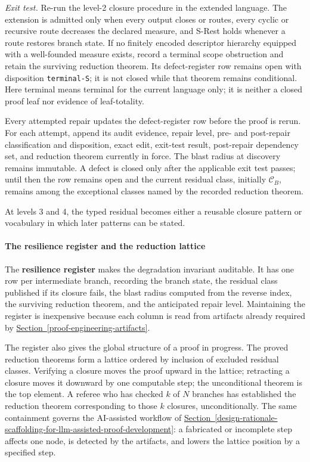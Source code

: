 \documentclass[
  11pt,
]{article}
\theoremstyle{definition}
\newcommand{\secref}[1]{\hyperref[#1]{Section~\ref*{#1}}}
\begin{document}
\begin{enumerate}
  \emph{Exit test.} Re-run the level-2 closure procedure in the extended
  language. The extension is admitted only when every output closes or
  routes, every cyclic or recursive route decreases the declared measure,
  and S-Rest holds whenever a route restores branch state. If no
  finitely encoded descriptor hierarchy equipped with a well-founded
  measure exists, record a terminal scope obstruction and retain the
  surviving reduction theorem. Its defect-register row remains open with disposition
  \texttt{terminal-S}; it is not closed while that theorem remains
  conditional. Here terminal means terminal for the current language
  only; it is neither a closed proof leaf nor evidence of leaf-totality.
\end{enumerate}

Every attempted repair updates the defect-register row before the proof
is rerun. For each attempt, append its audit evidence, repair level,
pre- and post-repair classification and disposition, exact edit,
exit-test result, post-repair dependency set, and reduction theorem
currently in force. The blast radius at discovery remains
immutable. A defect is closed only after the applicable exit test
passes; until then the row remains open and the current residual class,
initially \(\mathcal C_B\), remains among the exceptional classes named
by the recorded reduction theorem.

At levels 3 and 4, the typed residual becomes either a reusable closure
pattern or vocabulary in which later patterns can be stated.

\paragraph{The resilience register and the reduction
lattice}\label{the-resilience-register-and-the-reduction-lattice}

The \textbf{resilience register} makes the degradation invariant
auditable. It has one row per intermediate branch, recording the branch
state, the residual class published if its closure fails, the blast
radius computed from the reverse index, the surviving reduction theorem,
and the anticipated repair level. Maintaining the register is
inexpensive because each column is read from artifacts already required
by \secref{proof-engineering-artifacts}.

The register also gives the global structure of a proof in progress. The
proved reduction theorems form a lattice ordered by inclusion of
excluded residual classes. Verifying a closure moves the proof upward in
the lattice; retracting a closure moves it downward by one computable
step; the unconditional theorem is the top element. A referee who has
checked \(k\) of \(N\) branches has established the reduction theorem
corresponding to those \(k\) closures, unconditionally. The same
containment governs the AI-assisted workflow of \secref{design-rationale-scaffolding-for-llm-assisted-proof-development}: a fabricated
or incomplete step affects one node, is detected by the artifacts, and
lowers the lattice position by a specified step.
\end{document}
